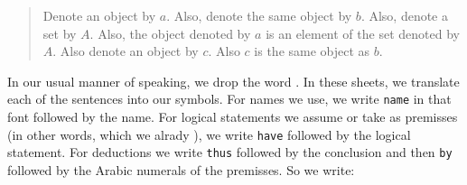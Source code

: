 \begin{quote}
Denote an object by $a$.
Also, denote the same object by $b$.
Also, denote a set by $A$.
Also, the object denoted by $a$ is an element of the set denoted by $A$.
Also denote an object by $c$.
Also $c$ is the same object as $b$.
\end{quote}

In our usual manner of speaking, we drop the word .
In these sheets, we translate each of the sentences into our symbols.
For names we use, we write \texttt{name} in that font followed by the name.
For logical statements we assume or take as premisses (in other words, which we alrady ), we write \texttt{have} followed by the logical statement.
For deductions we write \texttt{thus} followed by the conclusion and then \texttt{by} followed by the Arabic numerals of the premisses.
So we write:

\begin{account}
\end{account}




